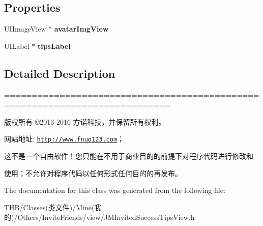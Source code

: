 \subsection*{Properties}
\begin{DoxyCompactItemize}
\item 
\mbox{\label{interface_j_m_invited_success_tips_view_a830805b26fc3ae13232497720dca664f}} 
U\+I\+Image\+View $\ast$ {\bfseries avatar\+Img\+View}
\item 
\mbox{\label{interface_j_m_invited_success_tips_view_a531241d2e2c0500c9b1d9562f10162ca}} 
U\+I\+Label $\ast$ {\bfseries tips\+Label}
\end{DoxyCompactItemize}


\subsection{Detailed Description}
============================================================================

版权所有 ©2013-\/2016 方诺科技，并保留所有权利。

网站地址\+: \href{http://www.fnuo123.com}{\tt http\+://www.\+fnuo123.\+com}； 



这不是一个自由软件！您只能在不用于商业目的的前提下对程序代码进行修改和

使用；不允许对程序代码以任何形式任何目的的再发布。 

 

The documentation for this class was generated from the following file\+:\begin{DoxyCompactItemize}
\item 
T\+H\+B/\+Classes(类文件)/\+Mine(我的)/\+Others/\+Invite\+Friends/view/J\+M\+Invited\+Success\+Tips\+View.\+h\end{DoxyCompactItemize}
